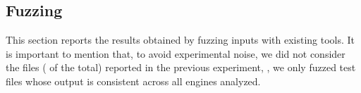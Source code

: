 \documentclass[10pt,conference,anonymous]{IEEEtran}
\begin{document}






\subsection{Fuzzing}

This section reports the results obtained by fuzzing inputs with
existing tools. It is important to mention that, to avoid experimental
noise, we did not consider the \nofuzzTotalFiles{} files ( of the
total) reported in the previous experiment, \ie{}, we only fuzzed test
files whose output is consistent across all engines analyzed.
\end{document}
